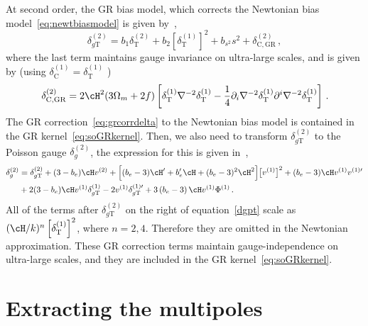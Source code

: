 At second order, the GR bias model, which corrects the Newtonian bias model~\eqref{eq:newtbiasmodel} is given by~\cite{Umeh:2019qyd},
\begin{equation}
	\delta_{g\mathrm{T}}^{(2)} = b_1 \delta_\mathrm{T}^{(2)} + b_2 \left[ \delta_\mathrm{T}^{(1)} \right]^2 + b_{s^2} s^2 + \delta_{\mathrm{C,GR}}^{(2)}\,,
\end{equation}
where the last term maintains gauge invariance on ultra-large scales, and is given by (using \( \delta_\mathrm{C}^{(1)} =  \delta_\mathrm{T}^{(1)}\) )
\begin{equation}\label{eq:grcorrdelta}
	\delta_{\mathrm{C,GR}}^{(2)} = 2 \cH^2 (3 \Omega_m + 2 f) \left[ \delta_\mathrm{T}^{(1)} \nabla^{-2} \delta_\mathrm{T}^{(1)} - \frac{1}{4} \partial_i \nabla^{-2} \delta_\mathrm{T}^{(1)} \partial^i \nabla^{-2} \delta_\mathrm{T}^{(1)} \right]\,.
\end{equation}
The GR correction~\eqref{eq:grcorrdelta} to the Newtonian bias model is contained in the GR kernel~\eqref{eq:soGRkernel}. Then, we also need to transform \(\delta_{g\mathrm{T}}^{(2)}\) to the Poisson	 gauge \( \delta_g^{(2)} \), the expression for this is given in~\cite{Jolicoeur:2017nyt}, 
\begin{align}
\delta_{g}^{(2)}  &= \delta_{g{\rm T} }^{(2)} + (3-b_e) \cH v^{(2)} +\Big[ (b_e-3) \cH' + b_e' \cH + (b_e-3)^2 \cH^2 \Big]  \big[v^{(1)}\big]^2 + (b_e-3)\cH   v^{(1)}  v^{(1)\prime} \nonumber\\
& +2(3-b_e)\cH  v^{(1)} \delta_{g{\rm T}}^{(1)}  - 2  v^{(1)} \delta_{g{\rm T}}^{(1)\prime} + 3 \left( b_e-3\right) \cH v^{(1)}\Phi^{(1)} \,.\label{dgpt}
\end{align}
All of the terms after $\delta_{g\mathrm{T}}^{(2)}$ on the right of equation~\eqref{dgpt} scale as $(\cH/k)^n \left[ \delta^{(1)}_\mathrm{T} \right]^2$, where $n = 2,4$. Therefore they are omitted in the Newtonian approximation. These GR correction terms maintain gauge-independence on ultra-large scales, and they are included in the GR kernel~\eqref{eq:soGRkernel}.




\section{Extracting the multipoles}\label{sec:extrmulti}

